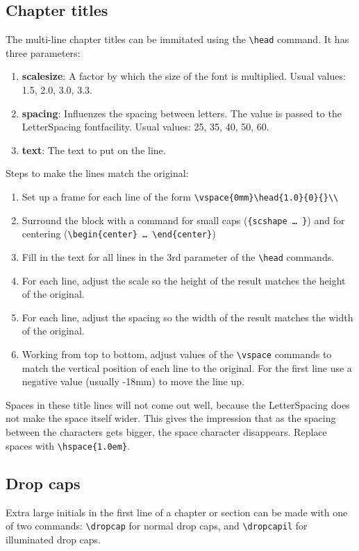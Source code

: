 \documentclass{report}
\begin{document}
\subsection{Chapter titles}
The multi-line chapter titles can be immitated using the \verb;\head;
command. It has three parameters:
\begin{enumerate}
\item {\ttfamily\bfseries scalesize}: A factor by which the size of the font is multiplied. Usual values: 1.5, 2.0, 3.0, 3.3.
\item {\ttfamily\bfseries spacing}: Influenzes the spacing between letters. The value is passed to the LetterSpacing fontfacility. Usual values: 25, 35, 40, 50, 60.
\item {\ttfamily\bfseries text}: The text to put on the line.
\end{enumerate}
Steps to make the lines match the original:
\begin{enumerate}
\item Set up a frame for each line of the form
 \verb;\vspace{0mm}\head{1.0}{0}{}\\;
\item Surround the block with a command for small caps
(\verb;{scshape … };) and for centering (\verb;\begin{center} … \end{center};)
\item Fill in the text for all lines in the 3rd parameter of the \verb;\head;
commands.
\item For each line, adjust the scale so the height of the result matches the height of the original.
\item For each line, adjust the spacing so the width of the result matches the width of the original.
\item Working from top to bottom, adjust values of the \verb;\vspace; commands
to match the vertical position of each line to the original. For the first line
use a negative value (usually -18mm) to move the line up.
\end{enumerate}
Spaces in these title lines will not come out well, because the LetterSpacing
does not make the space itself wider. This gives the impression that as the
spacing between the characters gets bigger, the space character disappears. Replace spaces with \verb;\hspace{1.0em};.


%
\subsection{Drop caps}
Extra large initials in the first line of a chapter or section can be made
with one of two commands: \verb;\dropcap; for normal drop caps,
and \verb;\dropcapil; for illuminated drop caps.
\end{document}
